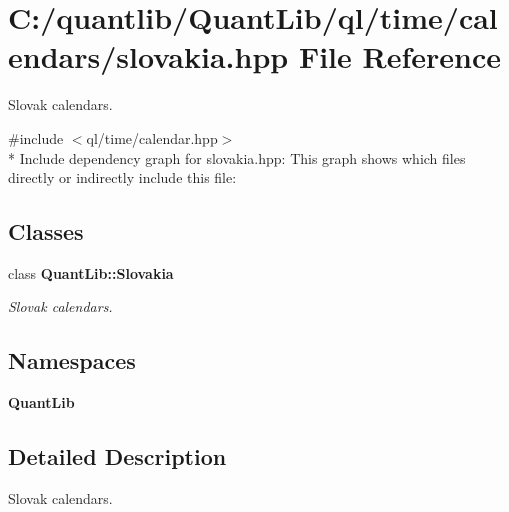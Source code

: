 \section{C\+:/quantlib/\+Quant\+Lib/ql/time/calendars/slovakia.hpp File Reference}
\label{slovakia_8hpp}


Slovak calendars.  


{\ttfamily \#include $<$ql/time/calendar.\+hpp$>$}\\*
Include dependency graph for slovakia.\+hpp\+:
This graph shows which files directly or indirectly include this file\+:
\subsection*{Classes}
\begin{DoxyCompactItemize}
\item 
class {\bf Quant\+Lib\+::\+Slovakia}
\begin{DoxyCompactList}\small\item\em Slovak calendars. \end{DoxyCompactList}\end{DoxyCompactItemize}
\subsection*{Namespaces}
\begin{DoxyCompactItemize}
\item 
 {\bf Quant\+Lib}
\end{DoxyCompactItemize}


\subsection{Detailed Description}
Slovak calendars. 

